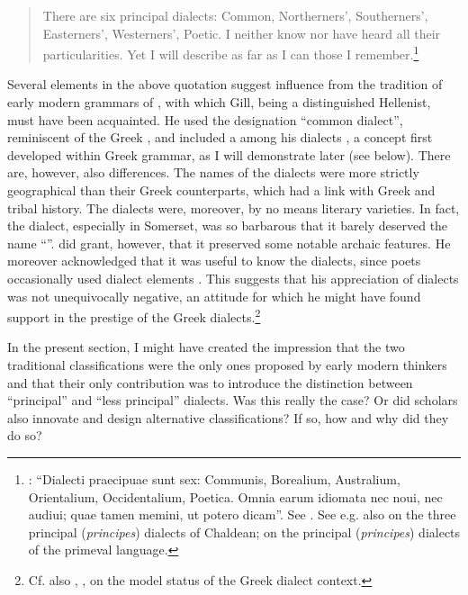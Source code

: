 \begin{quote}
There are six principal dialects: Common, Northerners’, Southerners’, Easterners’, Westerners’, Poetic. I neither know nor have heard all their particularities. Yet I will describe as far as I can those I remember.\footnote{\citet[15]{Gill1619}: “Dialecti praecipuae sunt sex: Communis, Borealium, Australium, Orientalium, Occidentalium, Poetica. Omnia earum idiomata nec noui, nec audiui; quae tamen memini, ut potero dicam”. See \citet{Kokeritz1938}. See e.g. also \citet[liv]{Thomassin1697} on the three principal (\textit{principes}) dialects of Chaldean; \citet[\textsc{xciii}]{Schultens1748} on the principal (\textit{principes}) dialects of the primeval language.}
\end{quote}

Several elements in the above quotation suggest influence from the tradition of early modern grammars of , with which Gill, being a distinguished Hellenist, must have been acquainted. He used the designation “common dialect”, reminiscent of the Greek , and included a  among his  dialects \citep[18]{Gill1619}, a concept first developed within Greek grammar, as I will demonstrate later (see  below). There are, however, also differences. The names of the  dialects were more strictly geographical than their Greek counterparts, which had a link with Greek  and tribal history. The  dialects were, moreover, by no means literary varieties. In fact, the  dialect, especially in Somerset, was so barbarous that it barely deserved the name “”. \citet[17]{Gill1619} did grant, however, that it preserved some notable archaic features. He moreover acknowledged that it was useful to know the dialects, since  poets occasionally used dialect elements \citep[18]{Gill1619}. This suggests that his appreciation of  dialects was not unequivocally negative, an attitude for which he might have found support in the prestige of the Greek dialects.\footnote{Cf. also , , on the model status of the Greek dialect context.}

In the present section, I might have created the impression that the two traditional classifications were the only ones proposed by early modern thinkers and that their only contribution was to introduce the distinction between “principal” and “less principal” dialects. Was this really the case? Or did scholars also innovate and design alternative classifications? If so, how and why did they do so?

